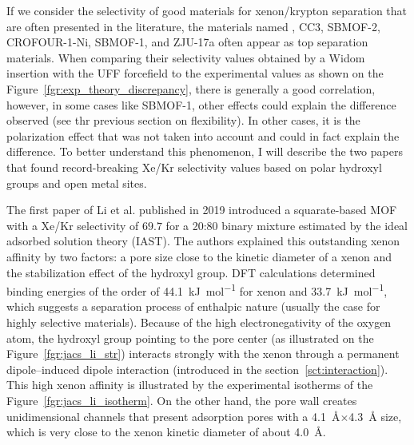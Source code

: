 \documentclass[main]{subfiles}
\begin{document}
If we consider the selectivity of good materials for xenon/krypton separation that are often presented in the literature, the materials named ,\autocite{Wang_2014} CC3,\autocite{Chen_2014} SBMOF-2,\autocite{Chen_2015} CROFOUR-1-Ni,\autocite{Mohamed_2016}  SBMOF-1,\autocite{Banerjee_2016} \autocite{Li_2019} and ZJU-17a\autocite{Pei_2022} often appear as top separation materials.
When comparing their selectivity values obtained by a Widom insertion with the UFF forcefield to the experimental values as shown on the Figure~\ref{fgr:exp_theory_discrepancy}, there is generally a good correlation, however, in some cases like SBMOF-1, other effects could explain the difference observed (see thr previous section on flexibility). In other cases, it is the polarization effect that was not taken into account and could in fact explain the difference. To better understand this phenomenon, I will describe the two papers that found record-breaking Xe/Kr selectivity values based on polar hydroxyl groups and open metal sites.

The first paper of Li et al.\autocite{Li_2019} published in 2019 introduced a squarate-based MOF with a Xe/Kr selectivity of $69.7$ for a 20:80 binary mixture estimated by the ideal adsorbed solution theory (IAST)\autocite{Cessford_2012}. The authors explained this outstanding xenon affinity by two factors: a pore size close to the kinetic diameter of a xenon and the stabilization effect of the hydroxyl group. DFT calculations determined binding energies of the order of \SI{44.1}{\kJ\per\mole} for xenon and \SI{33.7}{\kJ\per\mole}, which suggests a separation process of enthalpic nature (usually the case for highly selective materials). Because of the high electronegativity of the oxygen atom, the hydroxyl group pointing to the pore center (as illustrated on the Figure~\ref{fgr:jacs_li_str}) interacts strongly with the xenon through a permanent dipole--induced dipole interaction (introduced in the section~\ref{sct:interaction}). This high xenon affinity is illustrated by the experimental isotherms of the Figure~\ref{fgr:jacs_li_isotherm}. On the other hand, the pore wall creates unidimensional channels that present adsorption pores with a \SI{4.1}{\angstrom}$\times$\SI{4.3}{\angstrom} size, which is very close to the xenon kinetic diameter of about \SI{4.0}{\angstrom}. 
\end{document}
